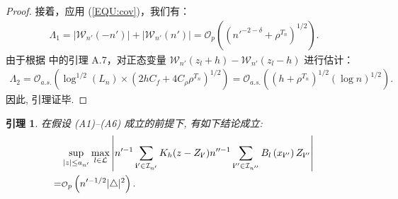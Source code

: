 \documentclass[a4paper,openay,14pt]{ctexbook}
\newtheorem{lem}{引理}
\numberwithin{equation}{section}
\numberwithin{lem}{section}
\begin{document}
\begin{proof}
接着，应用 (\ref{EQU:cov})，我们有：
\begin{align*}
    \Lambda_1 = \left\vert \mathcal{W}_{n'}(-n')\right\vert+ \left\vert \mathcal{W}_{n'}(n')\right\vert = \mathcal{O}_{p}\left(\left(n'^{-2-\delta}+\rho^{T_n}\right)^{1/2}\right).
\end{align*}
由于根据 \cite{wang2022oracle} 中的引理 A.7，对正态变量 $\mathcal{W}_{n'}(z_l+h) - \mathcal{W}_{n'}(z_l-h)$ 进行估计：
\begin{align*}
    \Lambda_2 = \mathcal{O}_{a.s.}\left(\log^{1/2}(L_n)\times(2hC_f+4C_{\rho}{\rho}^{T_n})^{1/2}\right) = \mathcal{O}_{a.s.}\left(\left(h+\rho^{T_n}\right)^{1/2}\left(\log n\right)^{1/2}\right).
\end{align*}
因此, 引理证毕.
\end{proof}

\begin{lem}\label{Lemma:KB}
    在假设 (A1)--(A6) 成立的前提下, 有如下结论成立:
    \begin{align}
        &\sup_{\vert z\vert\leq a_{n'}}\max_{l\in\mathcal{L}}\left\vert n'^{-1}\sum_{\mathbf{i}'\in\mathcal{I}_{n'}}K_h(z-Z_{\mathbf{i}'})n''^{-1}\sum_{\mathbf{i}''\in\mathcal{I}_{n''}}B_{l}\left(x_{\mathbf{i}''}\right)Z_{\mathbf{i}''}\right\vert \notag\\
        = &{\scriptstyle{\mathcal{O}}}_p\left(n'^{-1/2}\vert\triangle\vert^2\right).\notag
    \end{align}
\end{lem}
\end{document}
